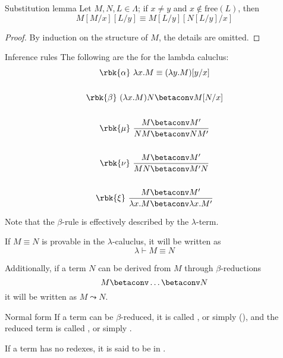 \documentclass[a4paper, 12pt]{report}
\begin{document}
    \begin{framedlem}{Substitution lemma}
        Let $M, N, L \in \Lambda$; if $x \neq y$ and $x \notin \mathrm{free}(L)$, then $$M[M/x][L/y] \equiv M[L/y][N[L/y]/x]$$
    \end{framedlem}

    \begin{proof}
        By induction on the structure of $M$, the details are omitted.
    \end{proof}

    \begin{frameddefn}[label={inf rules}]{Inference rules}
        The following are the  for the lambda caluclus:
        \begin{gather*}
            \rbk{\alpha} \ \lambda x.M \equiv (\lambda y.M)[y/x] \\ \\
            \rbk{\beta} \ (\lambda x.M)N \betaconv M[N/x] \\ \\
            \rbk{\mu} \ \dfrac{M \betaconv M'}{NM \betaconv NM'} \\ \\
            \rbk{\nu} \ \dfrac{M \betaconv M'}{MN \betaconv M'N} \\ \\
            \rbk{\xi} \ \dfrac{M \betaconv M'}{\lambda x.M \betaconv \lambda x.M'}
        \end{gather*}

        Note that the $\beta$-rule is effectively  described by the $\lambda$-term.
    \end{frameddefn}

    If $M \equiv N$ is provable in the $\lambda$-caluclus, it will be written as $$\lambda \vdash M \equiv N$$

    Additionally, if a term $N$ can be derived from $M$ through $\beta$-reductions $$M \betaconv \ldots \betaconv N$$ it will be written as $M \leadsto N$.

    \begin{frameddefn}{Normal form}
         If a term can be $\beta$-reduced, it is called , or simply  (), and the reduced term is called , or simply .

         If a term has no redexes, it is said to be in .
    \end{frameddefn}
\end{document}
